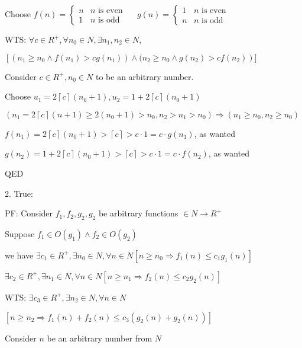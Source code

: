 \documentclass[12pt]{article}
\begin{document}
Choose $f(n)=\left\{\begin{array}{ll}n & n \text { is even } \\ 1 & n \text { is odd }\end{array} \quad g(n)= \begin{cases}1 & n \text { is even } \\ n & n \text { is odd }\end{cases}\right.$

WTS: $\forall c \in R^{+}, \forall n_{0} \in N, \exists n_{1}, n_{2} \in N$,

$\left[\left(n_{1} \geq n_{0} \wedge f\left(n_{1}\right)>c g\left(n_{1}\right)\right) \wedge(n_{2} \geq n_{0} \wedge g\left(n_{2}\right)>c f\left(n_{2}\right)\right)]$

Consider $c \in R^{+}, n_{0} \in N$ to be an arbitrary number.

Choose $u_{1}=2\left\lceil c\right\rceil\left(n_{0}+1\right), u_{2}=1+2\left\lceil c\right\rceil\left(n_{0}+1\right)$

$\left(n_{1}=2 \left\lceil c\right\rceil(n+1) \geq 2\left(n_{0}+1\right)>n_{0}, n_{2}>n_{1}>n_{0}\right) \Rightarrow\left(n_{1} \geq n_{0}, n_{2} \geq n_{0}\right)$

$f\left(n_{1}\right)=2\left\lceil c\right\rceil\left(n_{0}+1\right)>\left\lceil c\right\rceil>c \cdot 1=c \cdot g\left(n_{1}\right)$, as wanted

$g\left(n_{2}\right)=1+2\left\lceil c\right\rceil\left(n_{0}+1\right)>\left\lceil c\right\rceil>c \cdot 1=c \cdot f\left(n_{2}\right)$, as wanted

QED

2. True:

PF: Consider $f_{1}, f_{2}, g_{2}, g_{2}$ be arbitrary functions $\in N \rightarrow R^{+}$

Suppose $f_{1} \in O\left(g_{1}\right) \wedge f_{2} \in O\left(g_{2}\right)$

we have
$\exists c_{1} \in R^{+}, \exists n_{0} \in N, \forall n \in N\left[n \geq n_{0} \Rightarrow f_{1}(n) \leq c_{1}g_1(n)\right]$

$
\exists c_{2} \in R^{+}, \exists n_{1} \in N, \forall n \in N \left[n \geq n_{1} \Rightarrow f_{2}(n) \leq c_{2} g_{2}(n)\right]
$

WTS: $\exists c_{3} \in R^{+}, \exists n_{2} \in N, \forall n \in N$

$\left[n \geq n_{2} \Rightarrow f_1(n)+f_2(n) \leq c_{3}\left(g_{2}(n)+g_{2}(n)\right)\right]$

Consider $n$ be an arbitrary number from $N$
\end{document}
